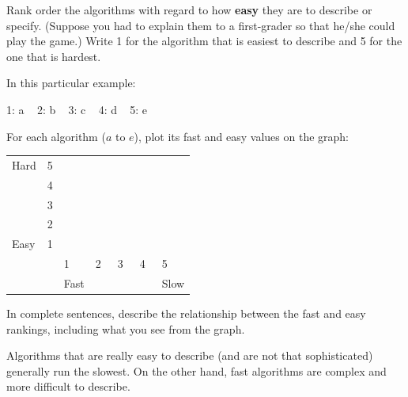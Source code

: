 \Q Rank order the algorithms with regard to how \textbf{easy} they are to describe or specify.
(Suppose you had to explain them to a first-grader so that he/she could play the game.)
Write 1 for the algorithm that is easiest to describe and 5 for the one that is hardest.

\begin{answer}
In this particular example:

1: a ~ 2: b ~ 3: c ~ 4: d ~ 5: e
\end{answer}


\Q For each algorithm ($a$ to $e$), plot its fast and easy values on the graph:

\newcommand{\X}{\ans{X}~~}

\begin{table}[h]
\centering
\renewcommand{\arraystretch}{1.6}
\begin{tabularx}{275pt}{X C{28pt} | C{28pt} C{28pt} C{28pt} C{28pt} C{28pt}}
Hard & 5 & \X                    \\
     & 4 &    & \X               \\
     & 3 &    &   & \X           \\
     & 2 &    &   &   & \X       \\
Easy & 1 &    &   &   &   & \X   \\
\hline
     & & 1    & 2 & 3 & 4 & 5    \\
     & & Fast &   &   &   & Slow \\
\end{tabularx}
\end{table}


\Q In complete sentences, describe the relationship between the fast and easy rankings, including what you see from the graph.

\begin{answer}
Algorithms that are really easy to describe (and are not that sophisticated) generally run the slowest.
On the other hand, fast algorithms are complex and more difficult to describe.
\end{answer}
